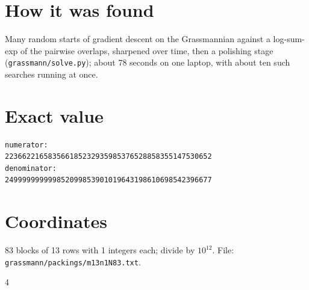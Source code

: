 \documentclass[11pt,a4paper]{article}
\begin{document}
\section{How it was found}
Many random starts of gradient descent on the Grassmannian against a log-sum-exp of the pairwise overlaps, sharpened over time, then a polishing stage (\texttt{grassmann/solve.py}); about 78 seconds on one laptop, with about ten such searches running at once.


\appendix
\section{Exact value}
{\small
\begin{verbatim}
numerator:
223662216583566185232935985376528858355147530652
denominator:
249999999999852099853901019643198610698542396677
\end{verbatim}}

\section{Coordinates}
83 blocks of 13 rows with 1 integers each; divide by $10^{12}$. File: \texttt{grassmann/packings/m13n1N83.txt}.
{\tiny
\begin{multicols}{4}
\end{multicols}}
\end{document}
